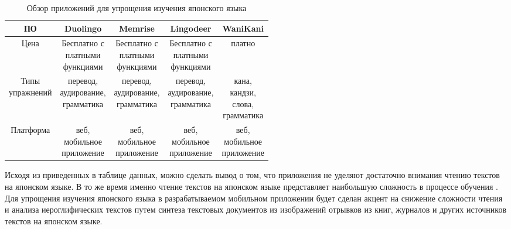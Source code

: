 \begin{table}[ht]
  \caption{Обзор приложений для упрощения изучения японского языка}
  \label{tab:jap-apps}
  \begin{center}
    \begin{tabular}{|c|c|c|c|c|}
      \hline
      ПО & Duolingo \cite{duolingo} & Memrise \cite{memrise} & Lingodeer \cite{lingodeer} & WaniKani \cite{wanikani} \\
      \hline
      Цена & \makecell{Бесплатно с \\ платными \\ функциями} & \makecell{Бесплатно с\\ платными \\ функциями} & \makecell{Бесплатно с \\ платными \\ функциями} & платно \\
      \hline
      \makecell{Типы \\ упражнений} & \makecell{перевод, \\ аудирование, \\ грамматика} & \makecell{перевод, \\ аудирование, \\ грамматика} & \makecell{перевод, \\ аудирование, \\ грамматика} & \makecell{кана, \\ кандзи, \\ слова, \\ грамматика} \\
      \hline
      Платформа & \makecell{веб,\\мобильное\\приложение} & \makecell{веб,\\мобильное\\приложение} & \makecell{веб,\\мобильное\\приложение} & \makecell{веб,\\мобильное\\приложение} \\
      \hline
    \end{tabular}
  \end{center}
\end{table}

Исходя из приведенных в таблице данных, можно сделать вывод о том,
что приложения не уделяют достаточно внимания чтению текстов
на японском языке. В то же время именно чтение текстов на японском
языке представляет наибольшую сложность в процессе обучения \cite{diff-kanji}.
Для упрощения изучения японского языка в разрабатываемом мобильном
приложении будет сделан акцент на снижение сложности чтения и анализа
иероглифических текстов путем синтеза текстовых документов из
изображений отрывков из книг, журналов и других источников текстов
на японском языке.

